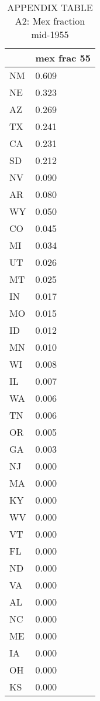 \begin{table}[htbp]
\caption{\label{clabel} APPENDIX TABLE A2: Mex fraction mid-1955}\centering\medskip
\begin{tabular}{|l|l|}\hline  
 & mex frac 55  \\ \hline  
NM & 0.609 \\ \hline 
NE & 0.323 \\ \hline 
AZ & 0.269 \\ \hline 
TX & 0.241 \\ \hline 
CA & 0.231 \\ \hline 
SD & 0.212 \\ \hline 
NV & 0.090 \\ \hline 
AR & 0.080 \\ \hline 
WY & 0.050 \\ \hline 
CO & 0.045 \\ \hline 
MI & 0.034 \\ \hline 
UT & 0.026 \\ \hline 
MT & 0.025 \\ \hline 
IN & 0.017 \\ \hline 
MO & 0.015 \\ \hline 
ID & 0.012 \\ \hline 
MN & 0.010 \\ \hline 
WI & 0.008 \\ \hline 
IL & 0.007 \\ \hline 
WA & 0.006 \\ \hline 
TN & 0.006 \\ \hline 
OR & 0.005 \\ \hline 
GA & 0.003 \\ \hline 
NJ & 0.000 \\ \hline 
MA & 0.000 \\ \hline 
KY & 0.000 \\ \hline 
WV & 0.000 \\ \hline 
VT & 0.000 \\ \hline 
FL & 0.000 \\ \hline 
ND & 0.000 \\ \hline 
VA & 0.000 \\ \hline 
AL & 0.000 \\ \hline 
NC & 0.000 \\ \hline 
ME & 0.000 \\ \hline 
IA & 0.000 \\ \hline 
OH & 0.000 \\ \hline 
KS & 0.000 \\ \hline 

\end{tabular}
\end{table}
